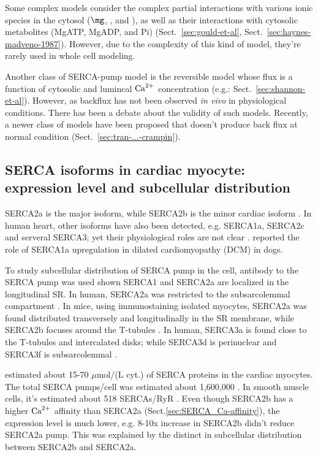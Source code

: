 Some complex models consider the complex partial interactions with
various ionic species in the cytosol ($\mg$, , and ), as
well as their interactions with cytosolic metabolites (MgATP, MgADP,
and Pi) (Sect.~\ref{sec:gould-et-al},
Sect.~\ref{sec:haynes-madveno-1987}). However, due to the complexity
of this kind of model, they're rarely used in whole cell modeling.

Another class of SERCA-pump model is the reversible model whose flux
is a function of cytosolic and lumincal ${\text{Ca}^{2+}}$ concentration (e.g.:
Sect.~\ref{sec:shannon-et-al}). However, as backflux has not been
observed {\it in vivo} in physiological conditions. There has been a
debate about the validity of such models. Recently, a newer class of
models have been proposed that doesn't produce back flux at normal
condition (Sect.~\ref{sec:tran-...-crampin}).

\subsection{SERCA isoforms in cardiac myocyte: expression level and subcellular
distribution}

SERCA2a is the major isoform, while SERCA2b is the minor cardiac isoform
\citep{Dally2010, vangheluwe2007}. In human heart, other isoforms have also been
detected, e.g. SERCA1a, SERCA2c and serveral SERCA3; yet their physiological
roles are not clear \citep{chemaly2013, Dally2006, Dally2009}.
\citep{summerfield2010} reported the role of SERCA1a upregulation in dilated
cardiomyopathy (DCM) in dogs.

To study subcellular distribution of SERCA pump in the cell, antibody to the
SERCA pump was used \citep{jorgensen1988} shown SERCA1 and SERCA2a are localized
in the longitudinal SR. In human, SERCA2a was restricted to the subsarcolemmal
compartment \citep{chemaly2013, greene2000, vangheluwe2007}. In mice, using
immunostaining isolated myocytes, SERCA2a was found distributed transversely
and longitudinally in the SR membrane, while SERCA2b focuses around the T-tubules
\citep{periasamy2001}. In human, SERCA3a is found close to the T-tubules and
intercalated disks; while SERCA3d is perinuclear and SERCA3f is subsarcolemmal
\citep{Dally2010, Dally2009}.
 

\citep{bers2001ecc} estimated about 15-70 $\mu$mol/(L cyt.) of SERCA proteins in
the cardiac myocytes. The total SERCA pumps/cell was estimated about 1,600,000
\citep{means2006}. In smooth muscle cells, it's estimated about 518 SERCAs/RyR
\citep{gomez-viquez2003}. Even though SERCA2b has a higher ${\text{Ca}^{2+}}$ affinity than
SERCA2a (Sect.\ref{sec:SERCA_Ca-affinity}), the expression level is much lower,
e.g. 8-10x increase in SERCA2b didn't reduce SERCA2a pump. This was explained by
the distinct in subcellular distribution between SERCA2b and SERCA2a.

